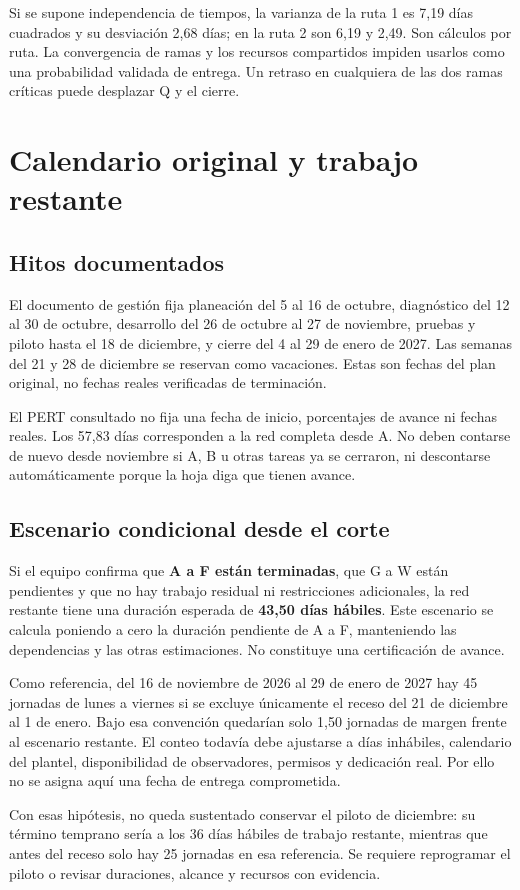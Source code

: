\documentclass[11pt,letterpaper]{article}
\newcommand{\pagina}[1]{\clearpage\section{#1}}
\begin{document}
Si se supone independencia de tiempos, la varianza de la ruta 1 es 7,19 días cuadrados y su desviación 2,68 días; en la ruta 2 son 6,19 y 2,49. Son cálculos por ruta. La convergencia de ramas y los recursos compartidos impiden usarlos como una probabilidad validada de entrega. Un retraso en cualquiera de las dos ramas críticas puede desplazar Q y el cierre.

\pagina{Calendario original y trabajo restante}
\subsection{Hitos documentados}
El documento de gestión fija planeación del 5 al 16 de octubre, diagnóstico del 12 al 30 de octubre, desarrollo del 26 de octubre al 27 de noviembre, pruebas y piloto hasta el 18 de diciembre, y cierre del 4 al 29 de enero de 2027. Las semanas del 21 y 28 de diciembre se reservan como vacaciones. Estas son fechas del plan original, no fechas reales verificadas de terminación.

El PERT consultado no fija una fecha de inicio, porcentajes de avance ni fechas reales. Los 57,83 días corresponden a la red completa desde A. No deben contarse de nuevo desde noviembre si A, B u otras tareas ya se cerraron, ni descontarse automáticamente porque la hoja diga que tienen avance.

\subsection{Escenario condicional desde el corte}
Si el equipo confirma que \textbf{A a F están terminadas}, que G a W están pendientes y que no hay trabajo residual ni restricciones adicionales, la red restante tiene una duración esperada de \textbf{43,50 días hábiles}. Este escenario se calcula poniendo a cero la duración pendiente de A a F, manteniendo las dependencias y las otras estimaciones. No constituye una certificación de avance.

Como referencia, del 16 de noviembre de 2026 al 29 de enero de 2027 hay 45 jornadas de lunes a viernes si se excluye únicamente el receso del 21 de diciembre al 1 de enero. Bajo esa convención quedarían solo 1,50 jornadas de margen frente al escenario restante. El conteo todavía debe ajustarse a días inhábiles, calendario del plantel, disponibilidad de observadores, permisos y dedicación real. Por ello no se asigna aquí una fecha de entrega comprometida.

Con esas hipótesis, no queda sustentado conservar el piloto de diciembre: su término temprano sería a los 36 días hábiles de trabajo restante, mientras que antes del receso solo hay 25 jornadas en esa referencia. Se requiere reprogramar el piloto o revisar duraciones, alcance y recursos con evidencia.
\end{document}
